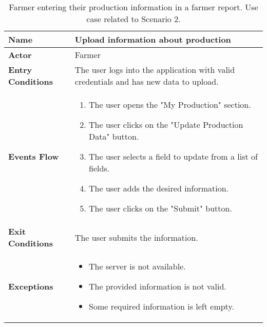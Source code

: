 \begin{table}[hbt!]
\centering
\small
\caption{\label{tab:farmerNewInfo}Farmer entering their production information in a farmer report. Use case related to Scenario 2.}
\renewcommand{\arraystretch}{1.25}
\begin{tabular}{|l|>{\raggedright\arraybackslash}m{12cm}|}

    \hline
    \textbf{Name} & Upload information about production\\
    \hline
   	\textbf{Actor} & Farmer\\
    \hline
    \textbf{Entry Conditions} & The user logs into the application with valid credentials and has new data to upload.\\
    \hline
    
    \textbf{Events Flow} & 
    		\begin{enumerate}
    			\item The user opens the "My Production" section.
    			\item The user clicks on the "Update Production Data" button.
    			\item The user selects a field to update from a list of fields.
    			\item The user adds the desired information.
    			\item The user clicks on the "Submit" button.
    		\end{enumerate}
    	\\
    \hline
    \textbf{Exit Conditions} & The user submits the information.\\
    \hline
    \textbf{Exceptions} & 
    		\begin{itemize}
    			\item The server is not available.
    			\item The provided information is not valid.
    			\item Some required information is left empty.
    		\end{itemize}
    \\
    \hline
\end{tabular}
\end{table}